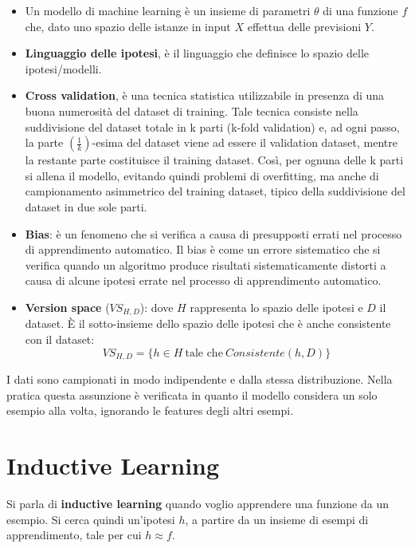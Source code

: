 \begin{itemize}
    \item Un modello di machine learning è un insieme di parametri $\theta$ di una funzione $f$ che, dato uno spazio delle istanze in input $X$ effettua delle previsioni $Y$.
    \item \textbf{Linguaggio delle ipotesi}, è il linguaggio che definisce lo spazio delle ipotesi/modelli.
    \item \textbf{Cross validation}, è una tecnica statistica utilizzabile in presenza di una buona numerosità del dataset di training. Tale tecnica consiste nella suddivisione del dataset totale in k parti (k-fold validation) e, ad ogni passo, la parte $ \left(\frac{1}{k}\right)$-esima del dataset viene ad essere il validation dataset, mentre la restante parte costituisce il training dataset. Così, per ognuna delle k parti si allena il modello, evitando quindi problemi di overfitting, ma anche di campionamento asimmetrico del training dataset, tipico della suddivisione del dataset in due sole parti.
    \item \textbf{Bias}: è un fenomeno che si verifica a causa di presupposti errati nel processo di apprendimento automatico. Il bias è come un errore sistematico che si verifica quando un algoritmo produce risultati sistematicamente distorti a causa di alcune ipotesi errate nel processo di apprendimento automatico.
    \item \textbf{Version space} ($VS_{H, D}$): dove $H$ rappresenta lo spazio delle ipotesi e $D$ il dataset. È il sotto-insieme dello spazio delle ipotesi che è anche consistente con il dataset:
    \begin{equation}
        VS_{H, D} = \{h \in H \ \text{tale che} \ Consistente(h, D)\}
    \end{equation}
\end{itemize}
\begin{definizione} 
    I dati sono campionati in modo indipendente e dalla stessa distribuzione. Nella pratica questa assunzione è verificata in quanto il modello considera un solo esempio alla volta, ignorando le features degli altri esempi.
\end{definizione}
\section{Inductive Learning}
Si parla di \textbf{inductive learning} quando voglio apprendere una funzione da un esempio. Si cerca quindi un'ipotesi $h$, a partire da un insieme di esempi di apprendimento, tale per cui $h \approx f$. 

